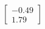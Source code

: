 \documentclass[preview]{standalone}
\begin{document}
\begin{align*}
\begin{bmatrix} -0.49 \\ 1.79 \end{bmatrix}
\end{align*}
\end{document}
